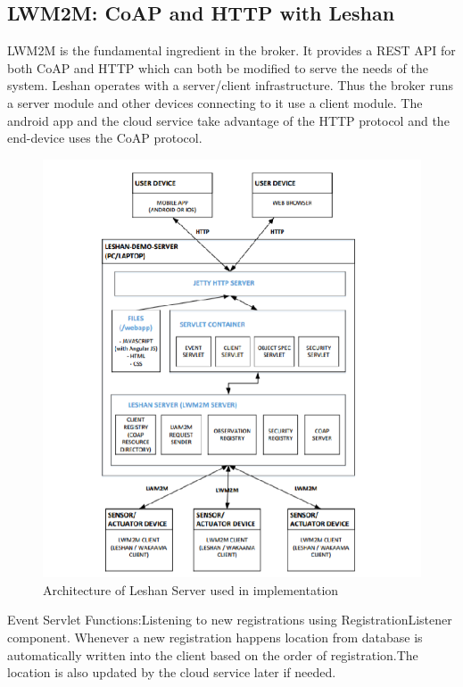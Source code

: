 \subsection{LWM2M: CoAP and HTTP with Leshan}


LWM2M is the fundamental ingredient in the broker. It provides a REST API for both CoAP and HTTP which can both be modified to serve the needs of the system. Leshan operates with a server/client infrastructure. Thus the broker runs a server module and other devices connecting to it use a client module. The android app and the cloud service take advantage of the HTTP protocol and the end-device uses the CoAP protocol.

\begin{figure}[h]
	\begin{center}
		\includegraphics[width=1.3\linewidth]{img/LeshanArc}
		\caption{Architecture of Leshan Server used in implementation} 
		\label{fig:fig3}
	\end{center}
\end{figure}

Event Servlet Functions:Listening to new registrations using RegistrationListener component. Whenever a new registration happens location from database is automatically written into the client based on the order of registration.The location is also updated by the cloud service later if needed. 

